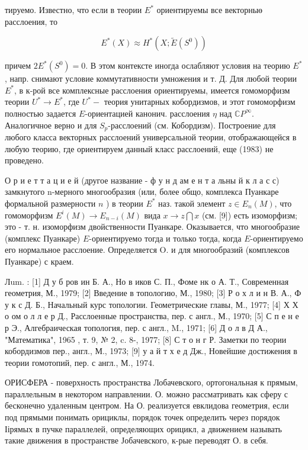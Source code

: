 \documentclass[10pt]{article}
\begin{document}
тируемо. Известно, что если в теории $E^{*}$ ориентируемы все векторныө расслоения, то

\[
E^{*}(X) \approx H^{*}\left(X ; \tilde{E}\left(S^{0}\right)\right)
\]

причем $2 E^{*}\left(S^{0}\right)=0$. В этом контексте иногда ослабляют условия на теорию $E^{*}$, напр. снимают условие коммутативности умножения и т. Д. Для любой теории $E^{*}$, в к-рой все комплексные расслоения ориентируемы, имеется гомоморфизм теории $U^{*} \rightarrow E^{*}$, где $U^{*}-$ теория унитарных кобордизмов, и этот гомоморфизм полностью задается $E$-ориентацией канонич. расслоения $\eta$ над $\mathbb{C} P^{\infty}$. Аналогичное верно и для $S_{p}$-расслоений (см. Кобордизм). Построение для любого класса векторных расслоений универсальной теории, отображающейся в любую теорию, где ориентируем данный класс расслоений, еще (1983) не проведено.

О р и е т т а ц и е й (другое название - ф у н д ам е н т а льны й к л а с с) замкнутого n-мерного многообразия (или, более общо, комплекса Пуанкаре формальной размерности $n$ ) в теории $E^{*}$ наз. такой элемент $z \in E_{n}(M)$, что гомоморфизм $E^{i}(M) \rightarrow E_{n-i}(M)$ вида $x \rightarrow z \bigcap x$ (см. [9]) есть изоморфизм; это - т. н. изоморфизм двойственности Пуанкаре. Оказывается, что многообразие (комплекс Пуанкаре) $E$-ориентируемо тогда и только тогда, когда $E$-ориентируемо его нормальное расслоение. Определяется $\mathrm{O}$. и для многообразий (комплексов Пуанкаре) с краем.

Лum. : [1] Д у б ров ин Б. А., Но в иков С. П., Фоме нк о А. Т., Современная геометрия, М., 1979; [2] Введение в топологию, М., 1980; [3] Р о х л и н В. А., Ф у к с Д. Б., Начальный курс топологии. Геометрические главы, М., 1977; [4] Х Х о ом о л л е р Д., Расслоенные пространства, пер. с англ., М., 1970; [5] С п е н е р Э., Алгебраическая топология, пер. с англ., M., 1971; [6] Д о л в Д А., "Математика", 1965 , т. 9, № 2, c. 8-, 1977; [8] С т о н г Р. Заметки по теории кобордизмов пер., англ., М., 1973; [9] у а й т х е д Дж., Новейшие достижения в теории гомотопий, пер. с англ., М., 1974.

ОРИСФЕРА - поверхность пространства Лобачевского, ортогональная к прямым, параллельным в некотором направлении. О. можно рассматривать как сферу с бесконечно удаленным центром. На О. реализуется евклидова геометрия, если под прямыми понимать орициклы, порядок точек определить через порядок Іірямых в пучке параллелей, определяющих орицикл, а движением называть такие движения в пространстве Јобачевского, к-рые переводят О. в себя.
\end{document}
